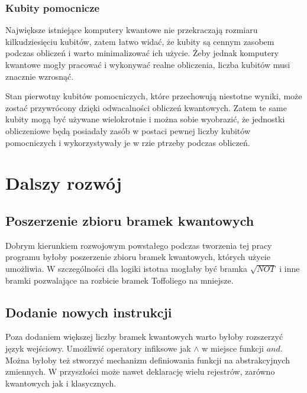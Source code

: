 \subsubsection{Kubity pomocnicze}
Największe istniejące komputery kwantowe nie przekraczają rozmiaru kilkudziesięciu kubitów, zatem łatwo widać, że kubity są cennym zasobem podczas obliczeń i warto minimalizować ich użycie. Żeby jednak komputery kwantowe mogły pracować i wykonywać realne obliczenia, liczba kubitów musi znacznie wzrosnąć. 
\par Stan pierwotny kubitów pomocniczych, które przechowują niestotne wyniki, może zostać przywrócony dzięki odwacalności obliczeń kwantowych. Zatem te same kubity mogą być używane wielokrotnie i można sobie wyobrazić, że jednostki obliczeniowe będą posiadały zasób w postaci pewnej liczby kubitów pomocniczych i wykorzystywały je w rzie ptrzeby podczas obliczeń.
\section{Dalszy rozwój}
\subsection{Poszerzenie zbioru bramek kwantowych}
Dobrym kierunkiem rozwojowym powstałego podczas tworzenia tej pracy programu byłoby poszerzenie zbioru bramek kwantowych, których użycie umożliwia. W szczególności dla logiki istotna mogłaby być bramka $\sqrt{NOT}$ i inne bramki pozwalające na rozbicie bramek Toffoliego na mniejsze.
\subsection{Dodanie nowych instrukcji}
Poza dodaniem większej liczby bramek kwantowych warto byłoby rozszerzyć język wejściowy. Umożliwić operatory infiksowe jak $\land$ w miejsce funkcji $and$. Można byłoby też stworzyć mechanizm definiowania funkcji na abstrakcyjnych zmiennych. W przyszłości może nawet deklarację wielu rejestrów, zarówno kwantowych jak i klasycznych. 